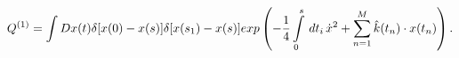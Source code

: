 \begin{equation}
Q^{(1)}=\int Dx(t)\delta[x(0)-x(s)]\delta[x(s_1)-x(s)]exp\left(-{1\over 4}
\int\limits_0^s\,dt_i\,\dot{x}^2+\sum\limits_{n=1}^M
\hat{k}(t_n)\cdot x(t_n)\right).
\end{equation} 
